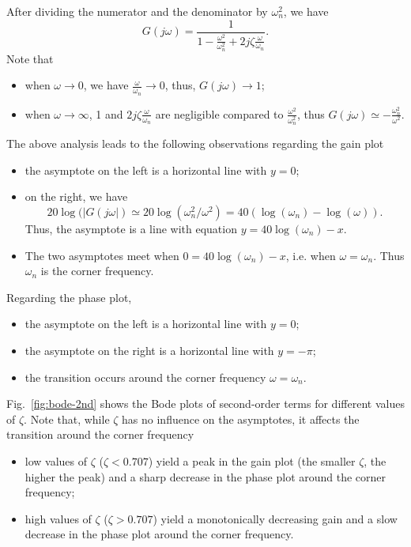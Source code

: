 \documentclass[a4paper,11pt]{report}
\theoremstyle{definition}
\begin{document}
After dividing the numerator and the denominator by $\omega_n^2$, we
have
\[
G(j\omega) = \frac{1}{1-\frac{\omega^2}{\omega_n^2} +2j\zeta\frac{\omega}{\omega_n}}.
\]
Note that 
\begin{itemize}
\item when $\omega\to 0$, we have $\frac{\omega}{\omega_n} \to 0$,
  thus, $G(j\omega)\to 1$;
\item when  $\omega\to\infty$, 1 and $2j\zeta\frac{\omega}{\omega_n}$
  are negligible compared to $\frac{\omega^2}{\omega_n^2}$, thus
    $G(j\omega)\simeq -\frac{\omega_n^2}{\omega^2}$.
\end{itemize}

The above analysis leads to the following observations regarding the
gain plot
\begin{itemize}
\item the asymptote on the left is a horizontal line with $y=0$;
\item on the right, we have 
  \[
  20\log(|G(j\omega|)\simeq20\log(\omega_n^2/\omega^2)=40(\log(\omega_n)-\log(\omega)).
  \]
  Thus, the asymptote is a line with equation $y=40\log(\omega_n)-x$.
\item The two asymptotes meet when $0=40\log(\omega_n)-x$, i.e. when
  $\omega=\omega_n$. Thus $\omega_n$ is the corner frequency.
\end{itemize}

Regarding the phase plot, 
\begin{itemize}
\item the asymptote on the left is a horizontal line with $y=0$;
\item the asymptote on the right is a horizontal line with $y=-\pi$;
\item the transition occurs around the corner frequency $\omega=\omega_n$.
\end{itemize}


Fig.~\ref{fig:bode-2nd} shows the Bode plots of second-order terms for
different values of $\zeta$. Note that, while $\zeta$ has no influence
on the asymptotes, it affects the transition around the corner
frequency
\begin{itemize}
\item low values of $\zeta$ ($\zeta<0.707$) yield a peak in the gain
  plot (the smaller $\zeta$, the higher the peak) and a sharp decrease
  in the phase plot around the corner frequency;
\item high values of $\zeta$ ($\zeta>0.707$) yield a monotonically
  decreasing gain and a slow decrease in the phase plot around the
  corner frequency.
\end{itemize}
\end{document}
